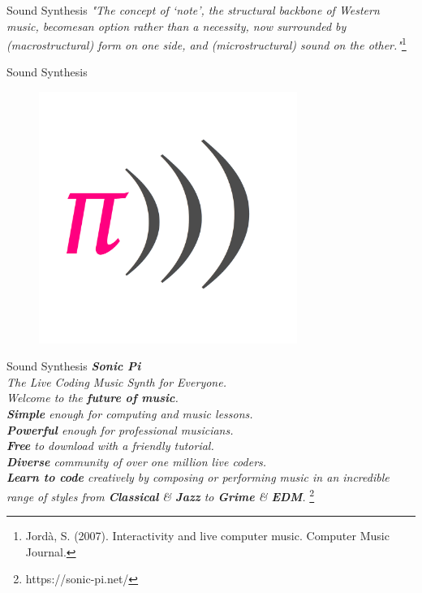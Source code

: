 \documentclass{beamer}
\newcommand\blfootnote[1]{%
  \begingroup
  \renewcommand\thefootnote{}\footnote{#1}%
  \addtocounter{footnote}{-1}%
  \endgroup
}
\begin{document}
\begin{frame}{Sound Synthesis}
    \textit{"The concept of ‘note’, the structural backbone of Western music, becomesan option rather than a necessity, now surrounded by (macrostructural) form on one side, and (microstructural) sound on the other."}\footnote{Jordà, S. (2007). Interactivity and live computer music. Computer Music Journal.}
\end{frame}



\begin{frame}{Sound Synthesis}
    \begin{figure}[h]
        \includegraphics[width=0.75\textwidth]{sonicpi.png}
    \end{figure}
\end{frame}

\begin{frame}{Sound Synthesis}
\textit{\textbf{Sonic Pi}\\
    The Live Coding Music Synth for Everyone.\\
    Welcome to the \textbf{future of music}. \\
    \vspace{5mm}
    \textbf{Simple} enough for computing and music lessons.\\
    \textbf{Powerful} enough for professional musicians.\\
    \textbf{Free} to download with a friendly tutorial.\\
    \textbf{Diverse} community of over one million live coders.\\
    \vspace{5mm}
    \textbf{Learn to code} creatively by composing or performing music in an incredible range of styles from \textbf{Classical} \& \textbf{Jazz} to \textbf{Grime} \& \textbf{EDM}.}
    \blfootnote{https://sonic-pi.net/}
\end{frame}
\end{document}
